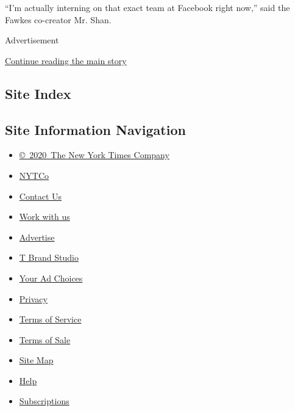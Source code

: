 ``I'm actually interning on that exact team at Facebook right now,''
said the Fawkes co-creator Mr. Shan.

Advertisement

\protect\hyperlink{after-bottom}{Continue reading the main story}

\hypertarget{site-index}{%
\subsection{Site Index}\label{site-index}}

\hypertarget{site-information-navigation}{%
\subsection{Site Information
Navigation}\label{site-information-navigation}}

\begin{itemize}
\tightlist
\item
  \href{https://help.nytimes3xbfgragh.onion/hc/en-us/articles/115014792127-Copyright-notice}{©~2020~The
  New York Times Company}
\end{itemize}

\begin{itemize}
\tightlist
\item
  \href{https://www.nytco.com/}{NYTCo}
\item
  \href{https://help.nytimes3xbfgragh.onion/hc/en-us/articles/115015385887-Contact-Us}{Contact
  Us}
\item
  \href{https://www.nytco.com/careers/}{Work with us}
\item
  \href{https://nytmediakit.com/}{Advertise}
\item
  \href{http://www.tbrandstudio.com/}{T Brand Studio}
\item
  \href{https://www.nytimes3xbfgragh.onion/privacy/cookie-policy\#how-do-i-manage-trackers}{Your
  Ad Choices}
\item
  \href{https://www.nytimes3xbfgragh.onion/privacy}{Privacy}
\item
  \href{https://help.nytimes3xbfgragh.onion/hc/en-us/articles/115014893428-Terms-of-service}{Terms
  of Service}
\item
  \href{https://help.nytimes3xbfgragh.onion/hc/en-us/articles/115014893968-Terms-of-sale}{Terms
  of Sale}
\item
  \href{https://spiderbites.nytimes3xbfgragh.onion}{Site Map}
\item
  \href{https://help.nytimes3xbfgragh.onion/hc/en-us}{Help}
\item
  \href{https://www.nytimes3xbfgragh.onion/subscription?campaignId=37WXW}{Subscriptions}
\end{itemize}
